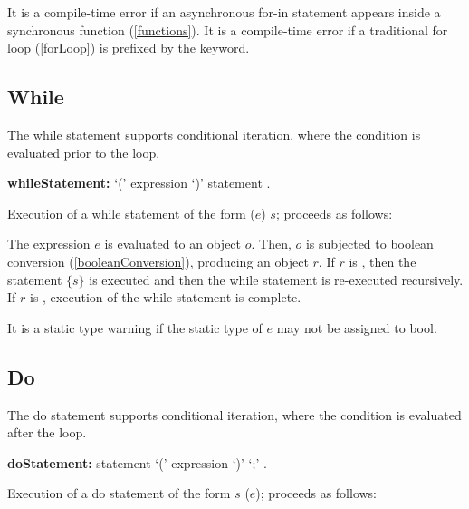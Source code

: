 \documentclass{article}
\newcommand{\code}[1]{{\sf #1}}
\begin{document}
\begin{itemize}
\LMHash{}
It is a compile-time error if an asynchronous for-in statement appears inside a synchronous function (\ref{functions}). It is a compile-time error if a traditional for loop  (\ref{forLoop}) is prefixed by the \AWAIT{}  keyword.



\subsection{While}

\LMHash{}
The while statement supports conditional iteration, where the condition is evaluated prior to the loop.

\begin{grammar}
{\bf whileStatement:}
      \WHILE{} `(' expression `)' statement  %
.
 \end{grammar}

\LMHash{}
 Execution of a while statement of the form \code{\WHILE{} ($e$) $s$;} proceeds as follows:

\LMHash{}
The expression $e$ is evaluated to an object $o$. Then, $o$ is  subjected to boolean conversion (\ref{booleanConversion}), producing an object $r$.  If $r$ is \TRUE{}, then the statement $\{s\}$ is executed and then the while statement is re-executed recursively. If $r$ is \FALSE{}, execution of the while statement is complete.

\LMHash{}
It is a static type warning if the static type of $e$ may not be assigned to \code{bool}.


\subsection{Do}

\LMHash{}
The do statement supports conditional iteration, where the condition is evaluated after the loop.

\begin{grammar}
{\bf doStatement:}
    \DO{} statement \WHILE{} `(' expression `)' `{\escapegrammar ;}'%
      .
 \end{grammar}


\LMHash{}
Execution of a do statement of the form \code{\DO{} $s$ \WHILE{} ($e$);} proceeds as follows:


\end{itemize}
\end{document}
